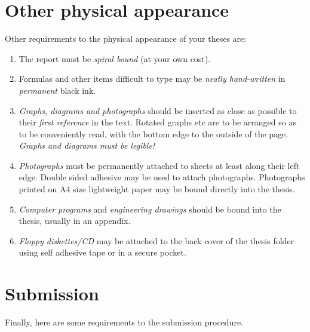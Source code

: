 \section{Other physical appearance}
Other requirements to the physical appearance of your theses are:
\begin{enumerate}
\item The report must be \emph{spiral bound} (at your own cost).
\item Formulas and other items difficult to type may be \emph{neatly
hand-written}
in \emph{permanent} black ink.
\item \emph{Graphs, diagrams and photographs} should be inserted as close as
possible to their \emph{first reference} in the text. Rotated
graphs etc are to be arranged so as to be conveniently read, with the
bottom edge to the outside of the page.
\emph{Graphs and diagrams must be legible!}
\item \emph{Photographs} must be permanently attached to sheets at least along
their left edge. Double sided adhesive may be
used to attach photographs. Photographs printed on A4 size lightweight
paper may be bound directly into the thesis.
\item \emph{Computer programs} and \emph{engineering drawings} should be bound into the
thesis, usually in an appendix.
\item \emph{Floppy diskettes/CD} may be attached to the back cover of the thesis
folder using self adhesive tape or in a secure
pocket.
\end{enumerate}

\section{Submission}

Finally, here are some requirements to the submission procedure. 

